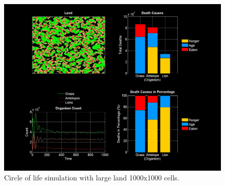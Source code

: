 \documentclass[11pt]{article}
\begin{document}
\begin{figure}
\centering
\includegraphics[scale=0.34]{LargeLand}
\caption{Circle of life simulation with large land 1000x1000 cells.}
\label{fig:largeMap}
\end{figure}
\end{document}
